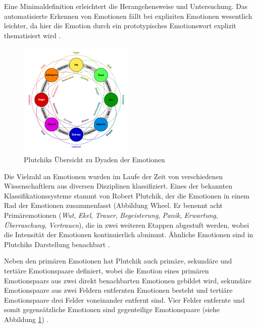 \documentclass[a4paper,10p]{article}
\begin{document}
Eine Minimaldefinition erleichtert die Herangehensweise und Untersuchung. Das automatisierte Erkennen von Emotionen fällt bei expliziten Emotionen wesentlich leichter, da hier die Emotion durch ein prototypisches Emotionswort explizit thematisiert wird \citep[vgl.][S. 34-41; S. 76-84]{Hillebrandt2011}. \par 

\begin{figure}
	\includegraphics[width=0.5\textwidth]{Plutchik_Dyads.png}
	\caption{Plutchiks Übersicht zu Dyaden der Emotionen}
	\label{fig:Dyads}
\end{figure}

Die Vielzahl an Emotionen wurden im Laufe der Zeit von verschiedenen Wissenschaftlern aus diversen Disziplinen klassifiziert. Eines der bekannten Klassifikationssysteme stammt von Robert Plutchik, der die Emotionen in einem Rad der Emotionen zusammenfasst (Abbildung {Wheel}. Er benennt acht Primäremotionen (\textit{Wut}, \textit{Ekel}, \textit{Trauer}, \textit{Begeisterung}, \textit{Panik}, \textit{Erwartung}, \textit{Überraschung}, \textit{Vertrauen}), die in zwei weiteren Etappen abgestuft werden, wobei die Intensität der Emotionen kontinuierlich abnimmt. Ähnliche Emotionen sind in Plutchiks Darstellung benachbart \citep[vgl.][S. 40-122]{Plutchik}. 

Neben den primären Emotionen hat Plutchik auch primäre, sekundäre und tertiäre Emotionspaare definiert, wobei die Emotion eines primären Emotionspaars aus zwei direkt benachbarten Emotionen gebildet wird, sekundäre Emotionspaare aus zwei Feldern entfernten Emotionen besteht und tertiäre Emotionspaare drei Felder voneinander entfernt sind. Vier Felder entfernte und somit gegensätzliche Emotionen sind gegenteilige Emotionspaare (siehe Abbildung \ref{fig:Dyads}) \citep[vgl.][S. 40-122]{Plutchik}.\par 
\end{document}

